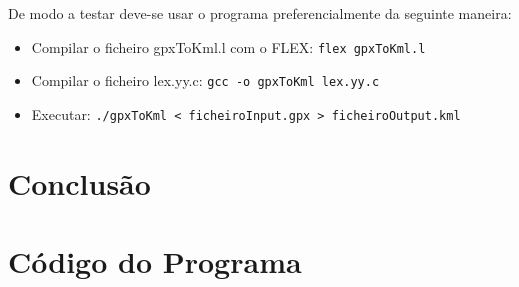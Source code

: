\documentclass{llncs}
\begin{document}
De modo a testar deve-se usar o programa preferencialmente da seguinte maneira:
\begin{itemize}
    \item Compilar o ficheiro gpxToKml.l com o FLEX: \verb|flex gpxToKml.l|
    \item Compilar o ficheiro lex.yy.c: \verb|gcc -o gpxToKml lex.yy.c|
    \item Executar: \verb|./gpxToKml < ficheiroInput.gpx > ficheiroOutput.kml|
\end{itemize}

\section{Conclusão}

\appendix
\section{Código do Programa}
\end{document}
